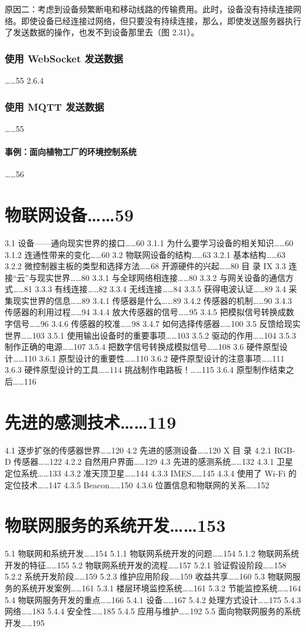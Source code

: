 \documentclass[12pt,UTF8]{ctexbook}
\begin{document}
原因二：考虑到设备频繁断电和移动线路的传输费用。此时，设备没有持续连接网络。即使设备已经连接过网络，但只要没有持续连接，那么，即使发送服务器执行了发送数据的操作，也发不到设备那里去（图 2.31）。



\subsection{使用 WebSocket 发送数据}……55
2.6.4
\subsection{使用 MQTT 发送数据}……55
\subsubsection{事例：面向植物工厂的环境控制系统}……56

\chapter{物联网设备……59}
3.1
设备——通向现实世界的接口……60
3.1.1
为什么要学习设备的相关知识……60
3.1.2
连通性带来的变化……60
3.2
物联网设备的结构……63
3.2.1
基本结构……63
3.2.2
微控制器主板的类型和选择方法……68
开源硬件的兴起……80
目
录
IX
3.3
连接“云”与现实世界……80
3.3.1
与全球网络相连接……80
3.3.2
与网关设备的通信方式……81
3.3.3
有线连接……82
3.3.4
无线连接……84
3.3.5
获得电波认证……89
3.4
采集现实世界的信息……89
3.4.1
传感器是什么……89
3.4.2
传感器的机制……90
3.4.3
传感器的利用过程……94
3.4.4
放大传感器的信号……95
3.4.5
把模拟信号转换成数字信号……96
3.4.6
传感器的校准……98
3.4.7
如何选择传感器……100
3.5
反馈给现实世界……103
3.5.1
使用输出设备时的重要事项……103
3.5.2
驱动的作用……104
3.5.3
制作正确的电源……107
3.5.4
把数字信号转换成模拟信号……108
3.6
硬件原型设计……110
3.6.1
原型设计的重要性……110
3.6.2
硬件原型设计的注意事项……111
3.6.3
硬件原型设计的工具……114
挑战制作电路板！……115
3.6.4
原型制作结束之后……116

\chapter{先进的感测技术……119}
4.1
逐步扩张的传感器世界……120
4.2
先进的感测设备……120
X
目
录
4.2.1
RGB-D 传感器……122
4.2.2
自然用户界面……129
4.3
先进的感测系统……132
4.3.1
卫星定位系统……133
4.3.2
准天顶卫星……144
4.3.3
IMES……145
4.3.4
使用了 Wi-Fi 的定位技术……147
4.3.5
Beacon……150
4.3.6
位置信息和物联网的关系……152

\chapter{物联网服务的系统开发……153}
5.1
物联网和系统开发……154
5.1.1
物联网系统开发的问题……154
5.1.2
物联网系统开发的特征……155
5.2
物联网系统开发的流程……157
5.2.1
验证假设阶段……158
5.2.2
系统开发阶段……159
5.2.3
维护应用阶段……159
收益共享……160
5.3
物联网服务的系统开发案例……161
5.3.1
楼层环境监控系统……161
5.3.2
节能监控系统……164
5.4
物联网服务开发的重点……166
5.4.1
设备……167
5.4.2
处理方式设计……175
5.4.3
网络……183
5.4.4
安全性……185
5.4.5
应用与维护……192
5.5
面向物联网服务的系统开发……195
\end{document}
